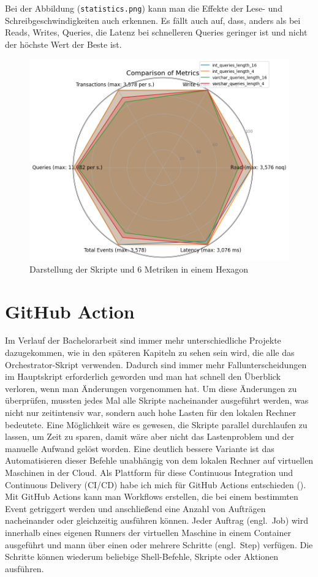 Bei der Abbildung (\texttt{statistics.png}) kann man die Effekte der Lese- und Schreibgeschwindigkeiten auch erkennen.
Es fällt auch auf, dass, anders als bei Reads, Writes, Queries, die Latenz bei schnelleren Queries geringer ist und nicht der höchste Wert der Beste ist.

\vspace{-5pt}
\begin{figure}[H]
    \centering
    \includegraphics[width=.6\textwidth]{PNGs/Script/Join_Typ/join-type/statistics}
    \caption[Join-Typ: Hexagon-Diagramm]{Darstellung der Skripte und 6 Metriken in einem Hexagon}
    \label{fig:join-typ-hex}
\end{figure}

\section{GitHub Action}\label{sec:github-action}

Im Verlauf der Bachelorarbeit sind immer mehr unterschiedliche Projekte dazugekommen, wie in den späteren Kapiteln zu sehen sein wird, die alle das Orchestrator-Skript verwenden.
Dadurch sind immer mehr Fallunterscheidungen im Hauptskript erforderlich geworden und man hat schnell den Überblick verloren, wenn man Änderungen vorgenommen hat.
Um diese Änderungen zu überprüfen, mussten jedes Mal alle Skripte nacheinander ausgeführt werden, was nicht nur zeitintensiv war, sondern auch hohe Lasten für den lokalen Rechner bedeutete.
Eine Möglichkeit wäre es gewesen, die Skripte parallel durchlaufen zu lassen, um Zeit zu sparen, damit wäre aber nicht das Lastenproblem und der manuelle Aufwand gelöst worden.
Eine deutlich bessere Variante ist das Automatisieren dieser Befehle unabhängig von dem lokalen Rechner auf virtuellen Maschinen in der Cloud.
Als Plattform für diese Continuous Integration und Continuous Delivery (CI/CD) habe ich mich für GitHub Actions entschieden (\cite{github_action_doku}).
Mit GitHub Actions kann man Workflows erstellen, die bei einem bestimmten Event getriggert werden und anschließend eine Anzahl von Aufträgen nacheinander oder gleichzeitig ausführen können.
Jeder Auftrag (engl.\ Job) wird innerhalb eines eigenen Runners der virtuellen Maschine in einem Container ausgeführt und mann über einen oder mehrere Schritte (engl.\ Step) verfügen.
Die Schritte können wiederum beliebige Shell-Befehle, Skripte oder Aktionen ausführen.

